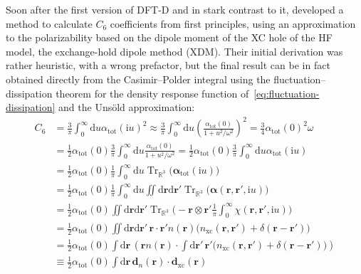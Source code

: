 Soon after the first version of DFT-D and in stark contrast to it, \citet{BeckeJCP05b} developed a method to calculate $C_6$ coefficients from first principles, using an approximation to the polarizability based on the dipole moment of the XC hole of the HF model, the exchange-hold dipole method (XDM).
Their initial derivation was rather heuristic, with a wrong prefactor, but the final result can be in fact obtained directly from the Casimir--Polder integral using the fluctuation--dissipation theorem for the density response function of~\eqref{eq:fluctuation-dissipation} and the Unsöld approximation:
\begin{equation}
\begin{aligned}
  C_6&=\frac3\pi\int_0^\infty\mathrm du\alpha_\text{tot}(\mathrm iu)^2
  \approx\frac3\pi\int_0^\infty\mathrm du\left(\frac{\alpha_\text{tot}(0)}{1+u^2/\omega^2}\right)^2
  =\frac34\alpha_\text{tot}(0)^2\omega \\
  &=\tfrac12\alpha_\text{tot}(0)\frac3\pi\int_0^\infty\mathrm du\frac{\alpha_\text{tot}(0)}{1+u^2/\omega^2}
  =\tfrac12\alpha_\text{tot}(0)\frac3\pi\int_0^\infty\mathrm du\alpha_\text{tot}(\mathrm iu) \\
  &=\tfrac12\alpha_\text{tot}(0)\frac1\pi\int_0^\infty\mathrm du\operatorname{Tr}_{\mathbb R^3}\big(\boldsymbol\alpha_\text{tot}(\mathrm iu)\!\big) \\
  &=\tfrac12\alpha_\text{tot}(0)\frac1\pi\int_0^\infty\mathrm du\iint\mathrm d\mathbf r\mathrm d\mathbf r'\operatorname{Tr}_{\mathbb R^3}\big(\boldsymbol\alpha(\mathbf r,\mathbf r',\mathrm iu)\!\big) \\
  &=\tfrac12\alpha_\text{tot}(0)\iint\mathrm d\mathbf r\mathrm d\mathbf r'\operatorname{Tr}_{\mathbb R^3}\big(-\mathbf r\otimes\mathbf r'{\textstyle\frac1\pi\int_0^\infty}\chi(\mathbf r,\mathbf r',\mathrm iu)\!\big) \\
  &=\tfrac12\alpha_\text{tot}(0)\iint\mathrm d\mathbf r\mathrm d\mathbf r'\,\mathbf r\cdot\mathbf r'n(\mathbf r)\big(n_\text{xc}(\mathbf r,\mathbf r')+\delta(\mathbf r-\mathbf r')\!\big) \\
  &=\tfrac12\alpha_\text{tot}(0)\int\mathrm d\mathbf r\,\left(\mathbf rn(\mathbf r)\cdot\int\mathrm d\mathbf r'\,\mathbf r'\big(n_\text{xc}(\mathbf r,\mathbf r')+\delta(\mathbf r-\mathbf r')\!\big)\!\right) \\
  &\equiv\tfrac12\alpha_\text{tot}(0)\int\mathrm d\mathbf r\,\mathbf d_n(\mathbf r)\cdot\mathbf d_\text{xc}(\mathbf r)
\end{aligned}
\end{equation}
